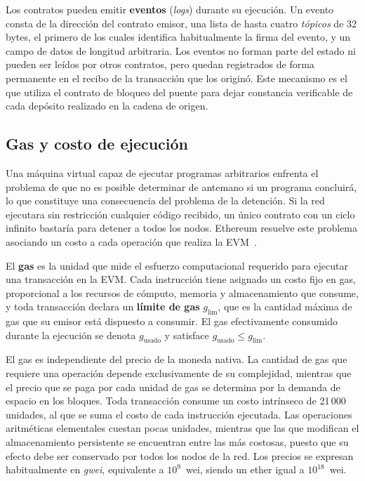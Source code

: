 Los contratos pueden emitir \textbf{eventos} (\textit{logs}) durante su ejecución. Un evento
consta de la dirección del contrato emisor, una lista de hasta cuatro \textit{tópicos} de
32 bytes, el primero de los cuales identifica habitualmente la firma del evento, y un campo de
datos de longitud arbitraria. Los eventos no forman parte del estado ni pueden ser leídos por
otros contratos, pero quedan registrados de forma permanente en el recibo de la transacción que
los originó. Este mecanismo es el que utiliza el contrato de bloqueo del puente para dejar
constancia verificable de cada depósito realizado en la cadena de origen.

\subsection{Gas y costo de ejecución}
\label{sec:eth_gas}

Una máquina virtual capaz de ejecutar programas arbitrarios enfrenta el problema de que no es
posible determinar de antemano si un programa concluirá, lo que constituye una consecuencia del
problema de la detención. Si la red ejecutara sin restricción cualquier código recibido, un único
contrato con un ciclo infinito bastaría para detener a todos los nodos. Ethereum resuelve este
problema asociando un costo a cada operación que realiza la EVM~\cite{wood2014ethereum}.

\begin{definition}
	\label{def:gas}
	El \textbf{gas} es la unidad que mide el esfuerzo computacional requerido para ejecutar una
	transacción en la EVM. Cada instrucción tiene asignado un costo fijo en gas, proporcional a
	los recursos de cómputo, memoria y almacenamiento que consume, y toda transacción declara un
	\textbf{límite de gas} $g_{\mathrm{lim}}$, que es la cantidad máxima de gas que su emisor
	está dispuesto a consumir. El gas efectivamente consumido durante la ejecución se denota
	$g_{\mathrm{usado}}$ y satisface $g_{\mathrm{usado}} \leq g_{\mathrm{lim}}$.
\end{definition}

El gas es independiente del precio de la moneda nativa. La cantidad de gas que requiere una
operación depende exclusivamente de su complejidad, mientras que el precio que se paga por cada
unidad de gas se determina por la demanda de espacio en los bloques. Toda transacción consume un
costo intrínseco de 21\,000 unidades, al que se suma el costo de cada instrucción ejecutada. Las
operaciones aritméticas elementales cuestan pocas unidades, mientras que las que modifican el
almacenamiento persistente se encuentran entre las más costosas, puesto que su efecto debe ser
conservado por todos los nodos de la red. Los precios se expresan habitualmente en
\textit{gwei}, equivalente a $10^{9}$~wei, siendo un ether igual a $10^{18}$~wei.

